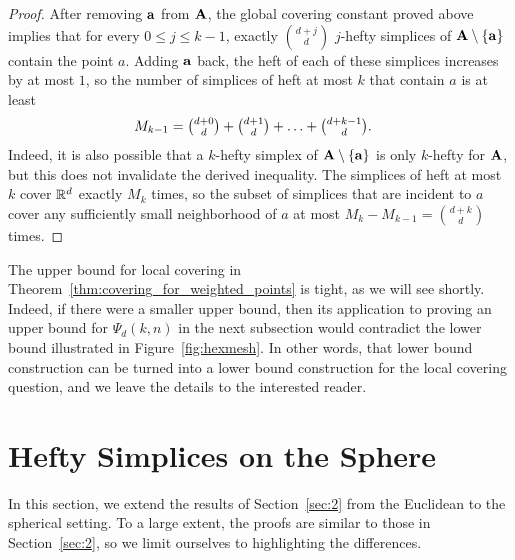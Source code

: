 \documentclass[a4paper,UKenglish,cleveref, autoref,numberwithinsect]{socg-lipics-v2021}
\newcommand {\mm}[1] {\ifmmode{#1}\else{\mbox{\(#1\)}}\fi}
\theoremstyle{plain}
\newcommand{\Rspace}        {\mm{{\mathbb R}}}
\newcommand{\AAA}           {\mm{\bf A}}
\newcommand{\aaa}           {\mm{\bf a}}
\begin{document}
\begin{proof}
  After removing $\aaa$ from $\AAA$, the global covering constant proved above implies that for every $0 \leq j \leq k-1$, exactly $\binom{d+j}{d}$ $j$-hefty simplices of $\AAA \setminus \{ \aaa \}$ contain the point $a$.
  Adding $\aaa$ back, the heft of each of these simplices increases by at most $1$, so the number of simplices of heft at most $k$ that contain $a$ is at least
  \begin{align}
    M_{k-1} &= \tbinom{d+0}{d} + \tbinom{d+1}{d} + \ldots + \tbinom{d+k-1}{d} .
  \end{align}
  Indeed, it is also possible that a $k$-hefty simplex of $\AAA \setminus \{ \aaa \}$ is only $k$-hefty for $\AAA$, but this does not invalidate the derived inequality.
  The simplices of heft at most $k$ cover $\Rspace^d$ exactly $M_k$ times, so the subset of simplices that are incident to $a$ cover any sufficiently small neighborhood of $a$ at most $M_k - M_{k-1} = \binom{d+k}{d}$ times.
\end{proof}
The upper bound for local covering in Theorem~\ref{thm:covering_for_weighted_points} is tight, as we will see shortly.
Indeed, if there were a smaller upper bound, then its application to proving an upper bound for $\Psi_d (k,n)$ in the next subsection would contradict the lower bound illustrated in Figure~\ref{fig:hexmesh}.
In other words, that lower bound construction can be turned into a lower bound construction for the local covering question, and we leave the details to the interested reader.
\section{Hefty Simplices on the Sphere}
\label{sec:3}
In this section, we extend the results of Section~\ref{sec:2} from the Euclidean to the spherical setting.
To a large extent, the proofs are similar to those in Section~\ref{sec:2}, so we limit ourselves to highlighting the differences.
\end{document}

